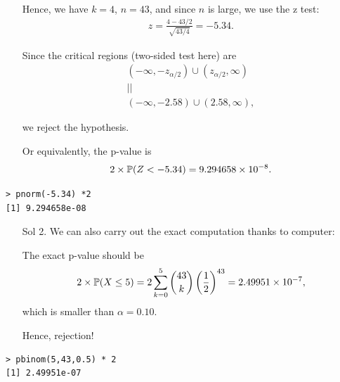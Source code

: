\begin{frame}[fragile]
\begin{itemize}
	\item[] Hence, we have $k=4$,  $n=43$, and since $n$ is large, we use the z test:
	\begin{align*}
		z= \frac{4-43/2}{\sqrt{43/4}} = -5.34.
	\end{align*}
	\bigskip

	\item[] Since the critical regions (two-sided test here) are
	\begin{gather*}
		(-\infty,-z_{\alpha/2}) \cup (z_{\alpha/2},\infty)\\ || \\
		(-\infty,-2.58) \cup (2.58,\infty),
 	\end{gather*}
	\item[] we reject the hypothesis.
	\bigskip
	\item[] Or equivalently, the p-value is
	\begin{align*}
		2\times \mathbb{P}(Z<-5.34) = 9.294658\times 10^{-8}.
	\end{align*}
	\myQED
\end{itemize}

\mySeparateLine
\vspace{-1.5em}
\begin{center}
\begin{minipage}{0.65\textwidth}
\begin{lstlisting}
> pnorm(-5.34) *2
[1] 9.294658e-08
\end{lstlisting}
\end{minipage}
\end{center}
\end{frame}
\begin{frame}[fragile]
\begin{itemize}
	\item[Sol 2.] We can also carry out the exact computation thanks to computer:
	\item[] The exact p-value should be
	\begin{align*}
		2\times\mathbb{P}(X\le 5) = 2 \sum_{k=0}^5 \binom{43}{k}\left(\frac{1}{2}\right)^{43} = 2.49951\times 10^{-7},
	\end{align*}
	which is smaller than $\alpha=0.10$.
	\item[] Hence, rejection! \myQED
\end{itemize}
\vfill

\mySeparateLine
\vspace{-1.5em}
\begin{center}
\begin{minipage}{0.65\textwidth}
\begin{lstlisting}
> pbinom(5,43,0.5) * 2
[1] 2.49951e-07
\end{lstlisting}
\end{minipage}
\end{center}

\end{frame}
